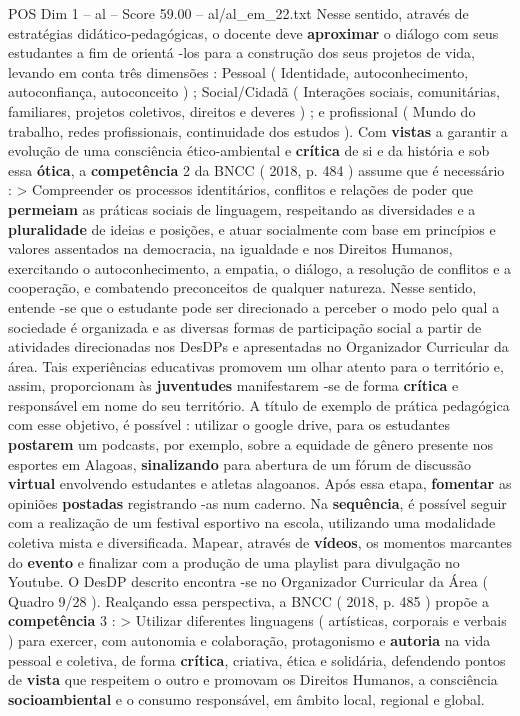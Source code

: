 \begin{textsample}{POS Dim 1 – al – Score 59.00 – al/al\_em\_22.txt}
Nesse sentido, através de estratégias didático-pedagógicas, o docente deve \textbf{aproximar} o diálogo com seus estudantes a fim de orientá -los para a construção dos seus projetos de vida, levando em conta três dimensões : Pessoal ( Identidade, autoconhecimento, autoconfiança, autoconceito ) ; Social/Cidadã ( Interações sociais, comunitárias, familiares, projetos coletivos, direitos e deveres ) ; e profissional ( Mundo do trabalho, redes profissionais, continuidade dos estudos ).
Com \textbf{vistas} a garantir a evolução de uma consciência ético-ambiental e \textbf{crítica} de si e da história e sob essa \textbf{ótica}, a \textbf{competência} 2 da BNCC ( 2018, p. 484 ) assume que é necessário : > Compreender os processos identitários, conflitos e relações de poder que \textbf{permeiam} as práticas sociais de linguagem, respeitando as diversidades e a \textbf{pluralidade} de ideias e posições, e atuar socialmente com base em princípios e valores assentados na democracia, na igualdade e nos Direitos Humanos, exercitando o autoconhecimento, a empatia, o diálogo, a resolução de conflitos e a cooperação, e combatendo preconceitos de qualquer natureza.
Nesse sentido, entende -se que o estudante pode ser direcionado a perceber o modo pelo qual a sociedade é organizada e as diversas formas de participação social a partir de atividades direcionadas nos DesDPs e apresentadas no Organizador Curricular da área.
Tais experiências educativas promovem um olhar atento para o território e, assim, proporcionam às \textbf{juventudes} manifestarem -se de forma \textbf{crítica} e responsável em nome do seu território.
A título de exemplo de prática pedagógica com esse objetivo, é possível : utilizar o google drive, para os estudantes \textbf{postarem} um podcasts, por exemplo, sobre a equidade de gênero presente nos esportes em Alagoas, \textbf{sinalizando} para abertura de um fórum de discussão \textbf{virtual} envolvendo estudantes e atletas alagoanos.
Após essa etapa, \textbf{fomentar} as opiniões \textbf{postadas} registrando -as num caderno.
Na \textbf{sequência}, é possível seguir com a realização de um festival esportivo na escola, utilizando uma modalidade coletiva mista e diversificada.
Mapear, através de \textbf{vídeos}, os momentos marcantes do \textbf{evento} e finalizar com a produção de uma playlist para divulgação no Youtube.
O DesDP descrito encontra -se no Organizador Curricular da Área ( Quadro 9/28 ).
Realçando essa perspectiva, a BNCC ( 2018, p. 485 ) propõe a \textbf{competência} 3 : > Utilizar diferentes linguagens ( artísticas, corporais e verbais ) para exercer, com autonomia e colaboração, protagonismo e \textbf{autoria} na vida pessoal e coletiva, de forma \textbf{crítica}, criativa, ética e solidária, defendendo pontos de \textbf{vista} que respeitem o outro e promovam os Direitos Humanos, a consciência \textbf{socioambiental} e o consumo responsável, em âmbito local, regional e global.

\end{textsample}
